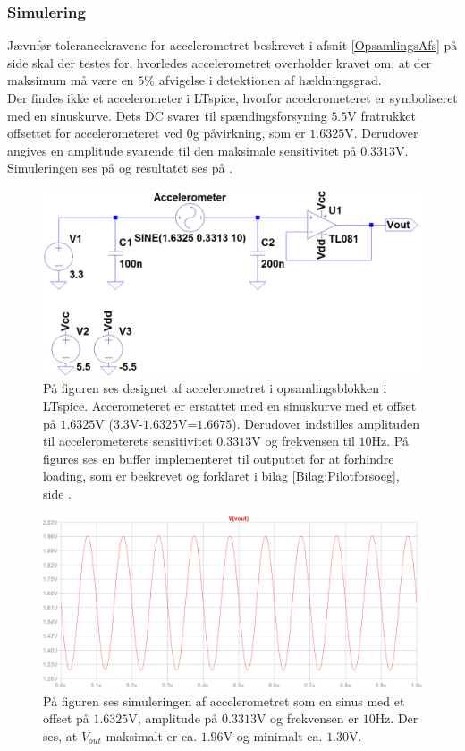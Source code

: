 \subsubsection{Simulering}
Jævnfør tolerancekravene for accelerometret beskrevet i afsnit \ref{OpsamlingsAfs} på side \pageref{OpsamlingsAfs} skal der testes for, hvorledes accelerometret overholder kravet om, at der maksimum må være en $5\%$ afvigelse i detektionen af hældningsgrad. \\
Der findes ikke et accelerometer i LTspice, hvorfor accelerometeret er symboliseret med en sinuskurve. Dets DC svarer til spændingsforsyning $5.5$V fratrukket offsettet for accelerometeret ved $0$g påvirkning, som er $1.6325$V. Derudover angives en amplitude svarende til den maksimale sensitivitet på $0.3313$V. Simuleringen ses på  og resultatet ses på .
\begin{figure}[H]
	\centering
	\includegraphics[scale=.4]{figures/cProblemloesning/Acc_Simulering1.PNG}
	\caption{På figuren ses designet af accelerometret i opsamlingsblokken i LTspice. Accerometeret er erstattet med en sinuskurve med et offset på $1.6325$V ($3.3$V-$1.6325$V=$1.6675$). Derudover indstilles amplituden til accelerometerets sensitivitet $0.3313$V og frekvensen til $10$Hz. På figures ses en buffer implementeret til outputtet for at forhindre loading, som er beskrevet og forklaret i bilag \ref{Bilag:Pilotforsoeg}, side \pageref{Bilag:Pilotforsoeg}.}
	\label{fig:acc_simulering}
\end{figure}
\begin{figure}[H]
	\centering
	\includegraphics[scale=.38]{figures/cProblemloesning/Acc_Simulering2.PNG}
	\caption{På figuren ses simuleringen af accelerometret som en sinus med et offset på $1.6325$V, amplitude på $0.3313$V og frekvensen er $10$Hz. Der ses, at $V_{out}$ maksimalt er ca. $1.96$V og minimalt ca. $1.30$V.}
	\label{fig:acc_simulering_resultat}
\end{figure}

